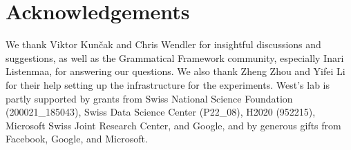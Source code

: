\section*{Acknowledgements}
 We thank Viktor Kun\v{c}ak and Chris Wendler for insightful discussions and suggestions, as well as the Grammatical Framework community, especially Inari Listenmaa, for answering our questions.
 We also thank Zheng Zhou and Yifei Li for their help setting up the infrastructure for the experiments.
 West's lab is partly supported by grants from
 Swiss National Science Foundation (200021\_185043),
 Swiss Data Science Center (P22\_08),
 H2020 (952215), Microsoft Swiss Joint Research Center, and Google, and by generous gifts from Facebook, Google, and Microsoft.